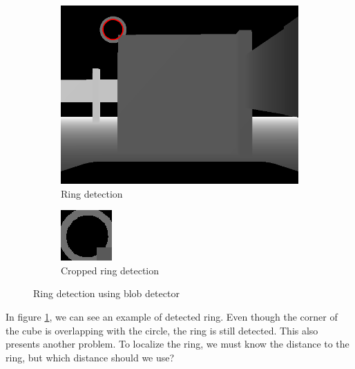 \documentclass[12pt,a4paper]{article}
\begin{document}
	\begin{figure}[h]
		\begin{subfigure}{.5\textwidth}
			\centering
			\includegraphics[width=.8\linewidth]{images/ring_detection}
			\caption{Ring detection}
			\label{fig:detected_ring}
		\end{subfigure}%
		\begin{subfigure}{.5\textwidth}
			\centering
			\includegraphics[width=.8\linewidth]{images/ring_detection_cropped}
			\caption{Cropped ring detection}
			\label{fig:detected_ring_cropped}
		\end{subfigure}
		\caption{Ring detection using blob detector}
		\label{fig:ring_detection}
	\end{figure}

	In figure \ref{fig:detected_ring}, we can see an example of detected ring. Even though the corner of the cube is overlapping with the circle, the ring is still detected. This also presents another problem. To localize the ring, we must know the distance to the ring, but which distance should we use? \\
	
\end{document}

